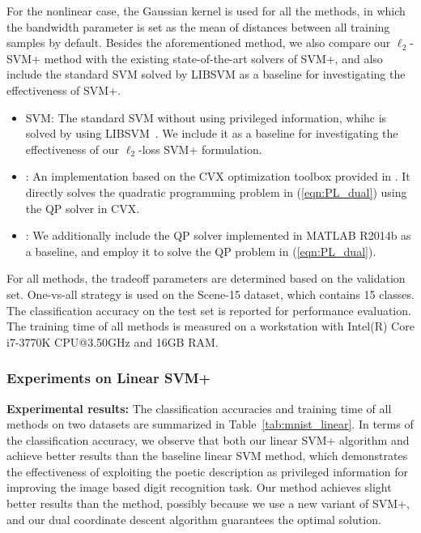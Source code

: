 For the nonlinear case, the Gaussian kernel is used for all the
methods, in which the bandwidth parameter is set as the mean of
distances between all training samples by default. Besides the
aforementioned \casmo method, we also compare our $\ell_2$-SVM+ method
with the existing state-of-the-art solvers of SVM+, and also include
the standard SVM solved by LIBSVM as a baseline for investigating the
effectiveness of SVM+.
\begin{itemize}
\setlength\itemsep{-2pt}
\item SVM: The standard SVM without using privileged information, whihc is solved by using LIBSVM~\cite{liblinear}. We include it as a baseline for investigating the effectiveness of our $\ell_2$-loss SVM+ formulation.
\item \cvx: An implementation based on the CVX optimization toolbox
  provided in \cite{MTLSVMPLUS}. It directly solves the quadratic
  programming problem in (\ref{eqn:PL_dual}) using the QP solver in
  CVX.
\item \matlab: We additionally include the QP solver implemented in MATLAB R2014b as a baseline, and employ it to solve the QP problem in (\ref{eqn:PL_dual}).
\end{itemize}

For all methods, the tradeoff parameters are determined based on the
validation set. One-vs-all strategy is used on the Scene-15 dataset,
which contains 15 classes. The classification accuracy on the test set
is reported for performance evaluation. The training time of all
methods is measured on a workstation with Intel(R) Core i7-3770K
CPU@3.50GHz and 16GB RAM.

\subsubsection{Experiments on Linear SVM+}
\textbf{Experimental results:} The classification accuracies and
training time of all methods on two datasets are summarized in
Table~\ref{tab:mnist_linear}. In terms of the classification accuracy,
we observe that both our linear SVM+ algorithm and \casmo achieve
better results than the baseline linear SVM method, which demonstrates
the effectiveness of exploiting the poetic description as privileged
information for improving the image based digit recognition task. Our
method achieves slight better results than the \casmo method, possibly
because we use a new variant of SVM+, and our dual coordinate descent
algorithm guarantees the optimal solution.

